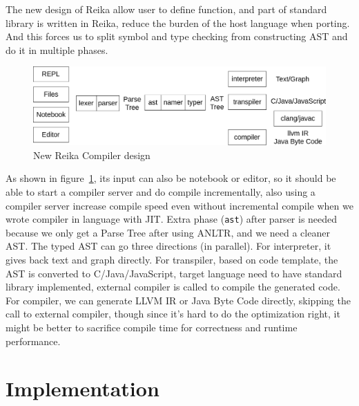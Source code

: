 \documentclass{article}
\begin{document}
The new design of Reika allow user to define function, and part of standard library is written in Reika,
reduce the burden of the host language when porting.
And this forces us to split symbol and type checking from constructing AST and do it in multiple phases.

\begin{figure}[h]
    \centering
    \includegraphics[width=\columnwidth]{reika-compiler}
    \caption{New Reika Compiler design}
    \label{fig:reika-compiler}
\end{figure}

As shown in figure~\ref{fig:reika-compiler}, its input can also be notebook or editor,
so it should be able to start a compiler server and do compile incrementally,
also using a compiler server increase compile speed even without incremental compile when we wrote compiler in language with JIT.
Extra phase (\verb+ast+) after parser is needed because we only get a Parse Tree after using ANLTR, and we need a cleaner AST.
The typed AST can go three directions (in parallel).
For interpreter, it gives back text and graph directly.
For transpiler, based on code template, the AST is converted to C/Java/JavaScript,
target language need to have standard library implemented, external compiler is called to compile the generated code.
For compiler, we can generate LLVM IR or Java Byte Code directly, skipping the call to external compiler,
though since it's hard to do the optimization right, it might be better to sacrifice compile time for correctness and runtime performance.



\section{Implementation}
\label{sec:implementation}
\end{document}
